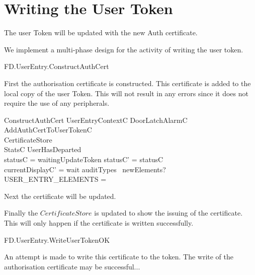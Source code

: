 \section{Writing the User Token}

The user Token will be updated with the new Auth certificate.

We implement a multi-phase design for the activity of writing the
user token. 

\begin{traceunit}{FD.UserEntry.ConstructAuthCert}
\end{traceunit}

First the authorisation certificate is constructed. 
This certificate is added to the local copy of the user Token.
This will not result in any errors since it does not require the use
of any peripherals. 


\begin{schema}{ConstructAuthCert}
	UserEntryContextC
\also
	\Xi DoorLatchAlarmC
\\      AddAuthCertToUserTokenC
\\      \Xi CertificateStore
\\      \Xi StatsC
\where
        \lnot UserHasDeparted
\\	statusC = waitingUpdateToken
\also
        statusC' = statusC
\\      currentDisplayC' = wait
\also
        auditTypes~ newElements? \cap USER\_ENTRY\_ELEMENTS = \emptyset
\end{schema}

Next the certificate will be updated.

Finally the $CertificateStore$ is updated to show the issuing of the
certificate. This will only happen if the certificate is written successfully.


\begin{traceunit}{FD.UserEntry.WriteUserTokenOK}
\end{traceunit}

An attempt is made to write this certificate to the token. The write of
the authorisation certificate may be successful...

